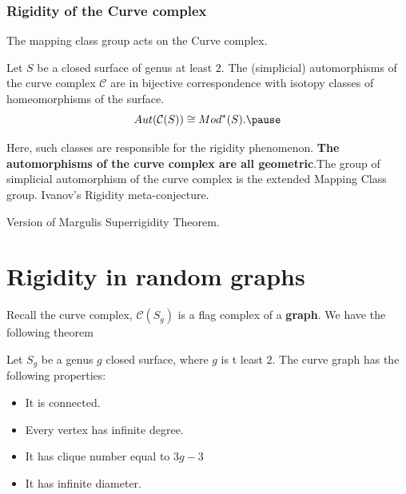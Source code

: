 \documentclass[handout]{beamer}
\theoremstyle{plain}
\begin{document}
\begin{frame} \frametitle{Rigidity  of  the  Curve  complex}
 The mapping class group acts on the Curve complex.

\begin{theorem}[Luo]

Let  $S$  be  a  closed  surface  of  genus  at  least  $2$. The (simplicial) automorphisms  of the curve complex $\mathcal{C}$ are  in bijective correspondence  with  isotopy classes of homeomorphisms  of  the  surface.   \pause 
$$Aut(\mathcal{C}(S))\cong Mod^{*}(S).\pause $$
\end{theorem}

\end{frame}

\begin{frame}
Here, such classes  are  responsible  for  the  rigidity  phenomenon. \textbf{The  automorphisms  of  the  curve  complex  are  all geometric}.\pause  The  group  of simplicial   automorphism  of  the  curve  complex  is  the  extended  Mapping  Class group. \pause Ivanov's Rigidity  meta-conjecture.

Version  of  Margulis Superrigidity Theorem. 
 

\end{frame}


\section{Rigidity in random graphs}
\begin{frame}

Recall  the  curve  complex, $\mathcal{C}(S_g)$ is a flag complex of a \textbf{graph}. We have the following theorem

 \begin{theorem}
Let  $S_g$ be  a  genus  $g$  closed  surface, where  $g$  is t  least $2$. 
The  curve  graph  has  the  following  properties: 
\begin{itemize}
\item  It  is  connected. 
\item Every  vertex  has  infinite degree. 
\item It  has  clique  number  equal  to $3g-3$
\item It  has infinite  diameter.  
\end{itemize}
\end{theorem}
\end{frame}
\end{document}
